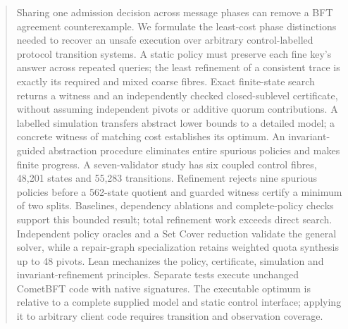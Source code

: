 \documentclass[a4paper,USenglish,cleveref,autoref,anonymous]{lipics-v2021}
\begin{document}
\begin{abstract}
Sharing one admission decision across message phases can remove a BFT agreement counterexample. We formulate the least-cost phase distinctions needed to recover an unsafe execution over arbitrary control-labelled protocol transition systems. A static policy must preserve each fine key's answer across repeated queries; the least refinement of a consistent trace is exactly its required and mixed coarse fibres. Exact finite-state search returns a witness and an independently checked closed-sublevel certificate, without assuming independent pivots or additive quorum contributions. A labelled simulation transfers abstract lower bounds to a detailed model; a concrete witness of matching cost establishes its optimum. An invariant-guided abstraction procedure eliminates entire spurious policies and makes finite progress. A seven-validator study has six coupled control fibres, 48,201 states and 55,283 transitions. Refinement rejects nine spurious policies before a 562-state quotient and guarded witness certify a minimum of two splits. Baselines, dependency ablations and complete-policy checks support this bounded result; total refinement work exceeds direct search. Independent policy oracles and a Set Cover reduction validate the general solver, while a repair-graph specialization retains weighted quota synthesis up to 48 pivots. Lean mechanizes the policy, certificate, simulation and invariant-refinement principles. Separate tests execute unchanged CometBFT code with native signatures. The executable optimum is relative to a complete supplied model and static control interface; applying it to arbitrary client code requires transition and observation coverage.
\end{abstract}


\clearpage
{}



\clearpage
\appendix

\end{document}
